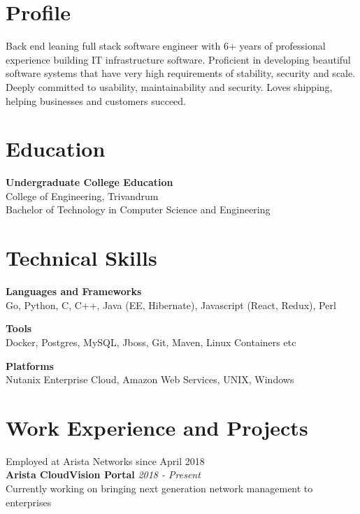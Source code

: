 \documentclass[line,margin]{res}
\begin{document}


\address{joji\_antony@gmx.com}
\address{+91 96323 41954}

\begin{resume}

\section{Profile}
Back end leaning full stack software engineer with 6+ years of professional experience building IT infrastructure software. Proficient in developing beautiful software systems that have very high requirements of stability, security and scale. Deeply committed to usability, maintainability and security. Loves shipping, helping businesses and customers succeed.

\section{Education}
{\bf Undergraduate College Education}\\
College of Engineering, Trivandrum\\
Bachelor of Technology in Computer Science and Engineering\\

\section{Technical Skills}

{\bf Languages and Frameworks}\\
Go, Python, C, C++, Java (EE, Hibernate), Javascript (React, Redux), Perl

{\bf Tools}\\
Docker, Postgres, MySQL, Jboss, Git, Maven, Linux Containers etc

{\bf Platforms}\\
Nutanix Enterprise Cloud, Amazon Web Services, UNIX, Windows

\section{Work Experience and Projects}

Employed at Arista Networks since April 2018\\

{\bf Arista CloudVision Portal} \hfill {\it{2018 - Present}}\\

Currently working on bringing next generation network management to enterprises\\


\end{resume}
\end{document}
